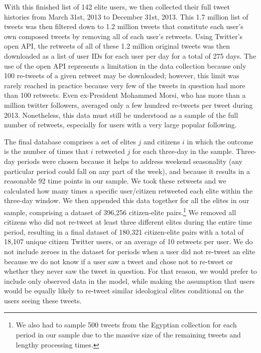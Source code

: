 \documentclass[12pt]{article}
\begin{document}
With this finished list of 142 elite users, we then collected their full tweet histories from March 31st, 2013 to December 31st, 2013. This 1.7 million list of tweets was then filtered down to 1.2 million tweets that constitute each user's own composed tweets by removing all of each user's retweets. Using Twitter's open API, the retweets of all of these 1.2 million original tweets was then downloaded as a list of user IDs for each user per day for a total of 275 days. The use of the open API represents a limitation in the data collection because only 100 re-tweets of a given retweet may be downloaded; however, this limit was rarely reached in practice because very few of the tweets in question had more than 100 retweets. Even ex-President Mohammed Morsi, who has more than a million twitter followers, averaged only a few hundred re-tweets per tweet during 2013. Nonetheless, this data must still be understood as a sample of the full number of retweets, especially for users with a very large popular following.

The final database comprises a set of elites $j$ and citizens $i$ in which the outcome is the number of times that $i$ retweeted $j$ for each three-day in the sample. Three-day periods were chosen because it helps to address weekend seasonality (any particular period could fall on any part of the week), and because it results in a reasonable 92 time points in our sample. We took these retweets and we calculated how many times a specific user/citizen retweeted each elite within the three-day window. We then appended this data together for all the elites in our sample, comprising a dataset of 396,256 citizen-elite pairs.\footnote{We also had to sample 500 tweets from the Egyptian collection for each period in our sample due to the massive size of the remaining tweets and lengthy processing times.} We removed all citizens who did not re-tweet at least three different elites during the entire time period, resulting in a final dataset of 180,321 citizen-elite pairs with a total of 18,107 unique citizen Twitter users, or an average of 10 retweets per user. We do not include zeroes in the dataset for periods when a user did not re-tweet an elite because we do not know if a user saw a tweet and chose not to re-tweet or whether they never saw the tweet in question. For that reason, we would prefer to include only observed data in the model, while making the assumption that users would be equally likely to re-tweet similar ideological elites conditional on the users seeing these tweets.
\end{document}
